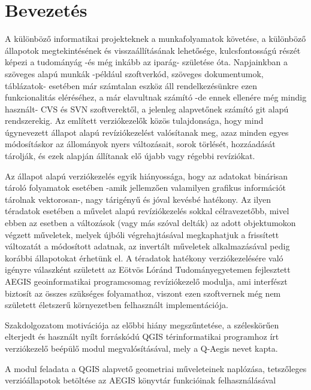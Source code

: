 \chapter{Bevezetés}
\label{ch:intro}

A különböző informatikai projekteknek a munkafolyamatok követése, a különböző állapotok megtekintésének és visszaállításának lehetősége, kulcsfontosságú részét képezi a tudományág -és még inkább az iparág- születése óta. Napjainkban a szöveges alapú munkák -például szoftverkód, szöveges dokumentumok, táblázatok- esetében már számtalan eszköz áll rendelkezésünkre ezen funkcionalitás eléréséhez, a már elavultnak számító -de ennek ellenére még mindig használt- CVS és SVN szoftverektől, a jelenleg alapvetőnek számító git alapú rendszerekig.
Az említett verziókezelők közös tulajdonsága, hogy mind úgynevezett állapot alapú revíziókezelést valósítanak meg, azaz minden egyes módosításkor az állományok nyers változásait, sorok törlését, hozzáadását tárolják, és ezek alapján állítanak elő újabb vagy régebbi revíziókat.

Az állapot alapú verziókezelés egyik hiányossága, hogy az adatokat binárisan tároló folyamatok esetében -amik jellemzően valamilyen grafikus információt tárolnak vektorosan-, nagy tárigényű és jóval kevésbé hatékony. Az ilyen téradatok esetében a művelet alapú revíziókezelés sokkal célravezetőbb, mivel ebben az esetben a változások (vagy más szóval delták) az adott objektumokon végzett műveletek, melyek újbóli végrehajtásával megkaphatjuk a frissített változatát a módosított adatnak, az invertált műveletek alkalmazásával pedig korábbi állapotokat érhetünk el.
A téradatok hatékony verziókezelésére való igényre válaszként született az Eötvös Lóránd Tudományegyetemen fejlesztett AEGIS geoinformatikai programcsomag revíziókezelő modulja, ami interfészt biztosít az összes szükséges folyamathoz, viszont ezen szoftvernek még nem született életszerű környezetben felhasznált implementációja.

Szakdolgozatom motivációja az előbbi hiány megszűntetése, a széleskörűen elterjedt és használt nyílt forráskódú QGIS térinformatikai programhoz írt verziókezelő beépülő modul megvalósításával, mely a Q-Aegis nevet kapta.

A modul feladata a QGIS alapvető geometriai műveleteinek naplózása, tetszőleges verzióállapotok betöltése az AEGIS könyvtár funkcióinak felhasználásával



